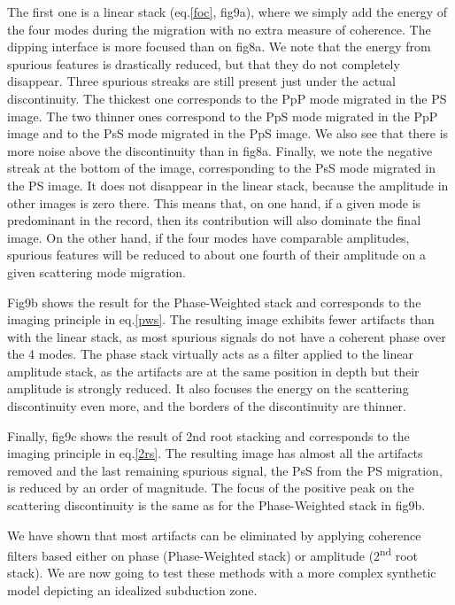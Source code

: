 \documentclass[10pt,a4paper]{article}
\numberwithin{equation}{section}
\begin{document}
The first one is a linear stack (eq.\eqref{foc}, fig9a), where we simply add the energy of the four modes during the migration with no extra measure of coherence.
The dipping interface is more focused than on fig8a.
We note that the energy from spurious features is drastically reduced, but that they do not completely disappear.
Three spurious streaks are still present just under the actual discontinuity.
The thickest one corresponds to the PpP mode migrated in the PS image.
The two thinner ones correspond to the PpS mode migrated in the PpP image and to the PsS mode migrated in the PpS image.
We also see that there is more noise above the discontinuity than in fig8a.
Finally, we note the negative streak at the bottom of the image, corresponding to the PsS mode migrated in the PS image.
It does not disappear in the linear stack, because the amplitude in other images is zero there.
This means that, on one hand, if a given mode is predominant in the record, then its contribution will also dominate the final image.
On the other hand, if the four modes have comparable amplitudes, spurious features will be reduced to about one fourth of their amplitude on a given scattering mode migration.

Fig9b shows the result for the Phase-Weighted stack and corresponds to the imaging principle in eq.\eqref{pws}.
The resulting image exhibits fewer artifacts than with the linear stack, as most spurious signals do not have a coherent phase over the 4 modes.
The phase stack virtually acts as a filter applied to the linear amplitude stack, as the artifacts are at the same position in depth but their amplitude is strongly reduced.
It also focuses the energy on the scattering discontinuity even more, and the borders of the discontinuity are thinner.

Finally, fig9c shows the result of 2nd root stacking and corresponds to the imaging principle in eq.\eqref{2rs}.
The resulting image has almost all the artifacts removed and the last remaining spurious signal, the PsS from the PS migration, is reduced by an order of magnitude.
The focus of the positive peak on the scattering discontinuity is the same as for the Phase-Weighted stack in fig9b.

We have shown that most artifacts can be eliminated by applying coherence filters based either on phase (Phase-Weighted stack) or amplitude (2\textsuperscript{nd} root stack).
We are now going to test these methods with a more complex synthetic model depicting an idealized subduction zone.
\end{document}
